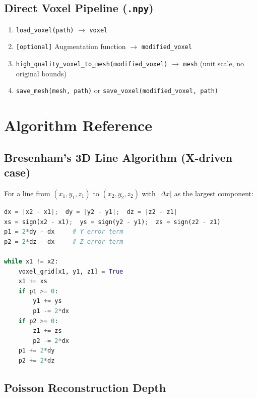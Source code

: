 \documentclass[12pt,a4paper]{article}
\begin{document}
\subsection{Direct Voxel Pipeline (\texttt{.npy})}

\begin{enumerate}[leftmargin=1.5em]
  \item \texttt{load\_voxel(path)} $\rightarrow$ \texttt{voxel}
  \item \texttt{[optional]} Augmentation function $\rightarrow$ \texttt{modified\_voxel}
  \item \texttt{high\_quality\_voxel\_to\_mesh(modified\_voxel)} $\rightarrow$ \texttt{mesh} (unit scale, no original bounds)
  \item \texttt{save\_mesh(mesh, path)} or \texttt{save\_voxel(modified\_voxel, path)}
\end{enumerate}

\newpage

\section{Algorithm Reference}

\subsection{Bresenham's 3D Line Algorithm (X-driven case)}

For a line from $(x_1,y_1,z_1)$ to $(x_2,y_2,z_2)$ with $|\Delta x|$ as the largest component:

\begin{lstlisting}[language=Python,escapechar=|]
dx = |x2 - x1|;  dy = |y2 - y1|;  dz = |z2 - z1|
xs = sign(x2 - x1);  ys = sign(y2 - y1);  zs = sign(z2 - z1)
p1 = 2*dy - dx     # Y error term
p2 = 2*dz - dx     # Z error term

while x1 != x2:
    voxel_grid[x1, y1, z1] = True
    x1 += xs
    if p1 >= 0:
        y1 += ys
        p1 -= 2*dx
    if p2 >= 0:
        z1 += zs
        p2 -= 2*dx
    p1 += 2*dy
    p2 += 2*dz
\end{lstlisting}

\subsection{Poisson Reconstruction Depth}
\end{document}

